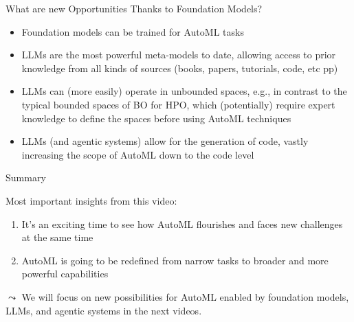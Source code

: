 \documentclass[main]{subfiles}
\begin{document}
\begin{frame}[c]{What are new Opportunities Thanks to Foundation Models?}

\begin{itemize}
    \item Foundation models can be trained for AutoML tasks  
    \item LLMs are the most powerful meta-models to date, allowing access to prior knowledge from all kinds of sources (books, papers, tutorials, code, etc pp)
    \item LLMs can (more easily) operate in unbounded spaces, e.g., in contrast to the typical bounded spaces of BO for HPO, which (potentially) require expert knowledge to define the spaces before using AutoML techniques
    \item LLMs (and agentic systems) allow for the generation of code, vastly increasing the scope of AutoML down to the code level
\end{itemize}

\end{frame}


\begin{frame}{Summary} 

Most important insights from this video:

\begin{enumerate}
    \item It's an exciting time to see how AutoML flourishes and faces new challenges at the same time
    \item AutoML is going to be redefined from narrow tasks to broader and more powerful capabilities
\end{enumerate}

$\leadsto$ We will focus on new possibilities for AutoML enabled by foundation models, LLMs, and agentic systems in the next videos.

\end{frame}
\end{document}
